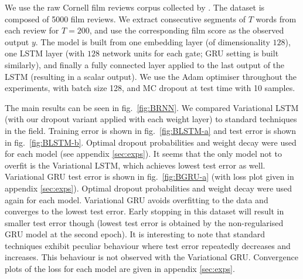 \documentclass{article}
\theoremstyle{definition}
\begin{document}
We use the raw Cornell film reviews corpus collected by \citet{pang2005seeing}.
The dataset is composed of 5000 film reviews.
We extract consecutive segments of $T$ words from each review for $T=200$, and use the corresponding film score as the observed output $y$. The model is built from one embedding layer (of dimensionality $128$), one LSTM layer (with $128$ network units for each gate; GRU setting is built similarly), and finally a fully connected layer applied to the last output of the LSTM (resulting in a scalar output).
We use the Adam optimiser \citep{kingma2014adam} throughout the experiments, with batch size 128, and MC dropout at test time with 10 samples. 

The main results can be seen in fig.\ \ref{fig:BRNN}. 
We compared Variational LSTM (with our dropout variant applied with each weight layer) to standard techniques in the field. Training error is shown in fig.\ \ref{fig:BLSTM-a} and test error is shown in fig.\ \ref{fig:BLSTM-b}.
Optimal dropout probabilities and weight decay were used for each model (see appendix \ref{sec:exps}). 
It seems that the only model not to overfit is the Variational LSTM, which achieves lowest test error as well. 
Variational GRU test error is shown in fig.\ \ref{fig:BGRU-a} (with loss plot given in appendix \ref{sec:exps}).
Optimal dropout probabilities and weight decay were used again for each model. 
Variational GRU avoids overfitting to the data and converges to the lowest test error. Early stopping in this dataset will result in smaller test error though (lowest test error is obtained by the non-regularised GRU model at the second epoch). It is interesting to note that standard techniques exhibit peculiar behaviour where test error repeatedly decreases and increases. This behaviour is not observed with the Variational GRU. 
Convergence plots of the loss for each model are given in appendix \ref{sec:exps}.
\end{document}
